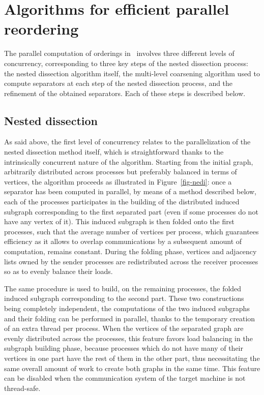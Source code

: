 \documentclass[fleqn,12pt,twoside]{article}
\begin{document}
\section{Algorithms for efficient parallel reordering}
\label{secalgo}

The parallel computation of orderings in \ptscotch\ involves three
different levels of concurrency, corresponding to three key steps of
the nested dissection process: the nested dissection algorithm itself,
the multi-level coarsening algorithm used to compute separators at
each step of the nested dissection process, and the refinement of the
obtained separators. Each of these steps is described below.

\subsection{Nested dissection}
\label{secalgond}

As said above, the first level of concurrency relates to the
parallelization of the nested dissection method itself, which is
straightforward thanks to the intrinsically concurrent nature of the
algorithm. Starting from the initial graph, arbitrarily distributed
across  processes but preferably balanced in terms of vertices,
the algorithm proceeds as illustrated in Figure~\ref{fig-nedi}: once
a separator has been computed in parallel, by means of a method described
below, each of the  processes participates in the building of the
distributed induced subgraph corresponding to the first separated part
(even if some processes do not have any vertex of it). This induced
subgraph is then folded onto the first 
processes, such that the average number of vertices per process,
which guarantees efficiency as it allows to overlap communications by
a subsequent amount of computation, remains constant. During the
folding phase, vertices and adjacency lists owned by the
 sender processes are redistributed across
the  receiver processes so as to evenly
balance their loads.

The same procedure is used to build, on the
 remaining processes, the folded induced
subgraph corresponding to the second part. These two constructions
being completely independent, the computations of the two induced
subgraphs and their folding can be performed in parallel, thanks to the
temporary creation of an extra thread per process. When the vertices
of the separated graph are evenly distributed across the processes,
this feature favors load balancing in the subgraph building phase,
because processes which do not have many of their vertices in one part
have the rest of them in the other part, thus necessitating the
same overall amount of work to create both graphs in the same time. This
feature can be disabled when the communication system of the target
machine is not thread-safe.
\end{document}
